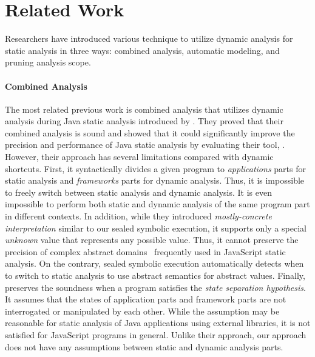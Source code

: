 \section{Related Work}\label{sec:related}
Researchers have introduced various technique to utilize dynamic
analysis for static analysis in three ways: combined analysis,
automatic modeling, and pruning analysis scope.


\paragraph{Combined Analysis}
The most related previous work is combined analysis that utilizes dynamic
analysis during Java static analysis introduced by \citet{concerto}.
They proved that their combined analysis is sound and showed that it could
significantly improve the precision and performance of Java static analysis by
evaluating their tool, \concerto.  However, their approach has several
limitations compared with dynamic shortcuts.  First, it syntactically
divides a given program to \textit{applications} parts for static
analysis and \textit{frameworks} parts for dynamic analysis.  Thus, it is impossible to
freely switch between static analysis and dynamic analysis.  It is
even impossible to perform both static and dynamic analysis of 
the same program part in different contexts.  In addition, while they
introduced \textit{mostly-concrete interpretation} similar to our
sealed symbolic execution, it supports only a special \textit{unknown}
value that represents any possible value.  Thus, it cannot preserve
the precision of complex abstract domains~\cite{revisit-recency,
  regex, weaklySPE} frequently used in JavaScript static analysis.
On the contrary, sealed symbolic execution automatically detects when
to switch to static analysis to use abstract semantics for abstract values.
Finally, \concerto preserves the soundness when a program satisfies
the \textit{state separation hypothesis}.  It assumes that the states
of application parts and framework parts are not interrogated
or manipulated by each other.  While the assumption may be reasonable
for static analysis of Java applications using external libraries, it
is not satisfied for JavaScript programs in general.  Unlike their
approach, our approach does not have any assumptions between static and
dynamic analysis parts.


